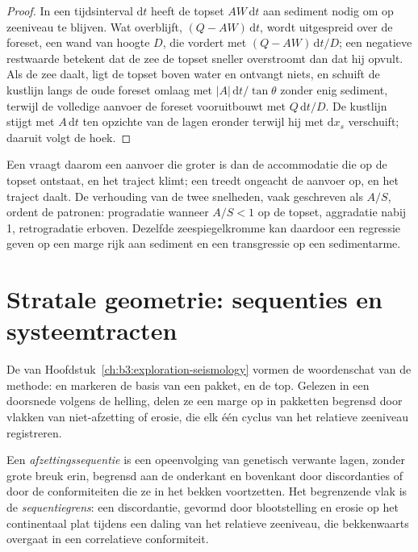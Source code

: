 \begin{proof}
In een tijdsinterval $\mathrm dt$ heeft de topset $AW\,\mathrm dt$ aan sediment nodig om
op zeeniveau te blijven. Wat overblijft, $(Q - AW)\,\mathrm dt$, wordt uitgespreid over de foreset,
een wand van hoogte $D$, die vordert met $(Q - AW)\,\mathrm dt/D$; een negatieve
restwaarde betekent dat de zee de topset sneller overstroomt dan dat hij opvult. Als de zee
daalt, ligt de topset boven water en ontvangt niets, en schuift de kustlijn
langs de oude foreset omlaag met $|A|\,\mathrm dt/\tan\theta$ zonder enig
sediment, terwijl de volledige aanvoer de foreset vooruitbouwt met $Q\,\mathrm
dt/D$. De kustlijn stijgt met $A\,\mathrm dt$ ten opzichte van de lagen eronder
terwijl hij met $\mathrm dx_s$ verschuift; daaruit volgt de hoek.
\end{proof}

Een  vraagt daarom een aanvoer die groter is dan de accommodatie
die op de topset ontstaat, en het traject klimt; een  treedt
ongeacht de aanvoer op, en het traject daalt. De verhouding van de twee snelheden,
vaak geschreven als $A/S$, ordent de patronen: progradatie wanneer $A/S < 1$ op de
topset, aggradatie nabij 1, retrogradatie erboven. Dezelfde zeespiegelkromme
kan daardoor een regressie geven op een marge rijk aan sediment en een
transgressie op een sedimentarme.

\section{Stratale geometrie: sequenties en systeemtracten}\label{sec:b3:sequence-stratigraphy:sequences}

De  van Hoofdstuk~\ref{ch:b3:exploration-seismology}
vormen de woordenschat van de methode:  en  markeren de basis van een
pakket,  en  de top. Gelezen in een doorsnede volgens de helling, delen ze
een marge op in pakketten begrensd door vlakken van niet-afzetting of
erosie, die elk één cyclus van het relatieve zeeniveau registreren.

\begin{definition}\label{def:b3:sequence-stratigraphy:sequence}
Een \emph{afzettingssequentie} is een opeenvolging
van genetisch verwante lagen, zonder grote breuk erin, begrensd aan de onderkant
en bovenkant door discordanties of door de conformiteiten die ze in het
bekken voortzetten. Het begrenzende vlak is de \emph{sequentiegrens}:
een discordantie, gevormd door blootstelling en erosie op het continentaal plat tijdens een
daling van het relatieve zeeniveau, die bekkenwaarts overgaat
in een correlatieve conformiteit.
\end{definition}

